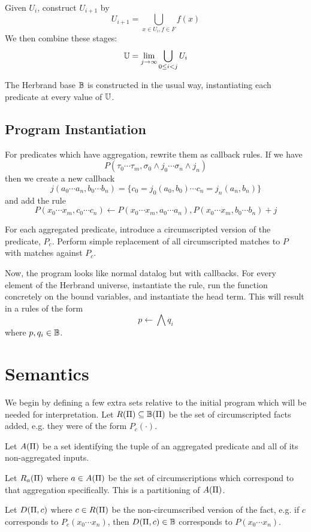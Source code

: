 Given $U_i$, construct $U_{i + 1}$ by
\[
	U_{i + 1} = \bigcup_{x \in U_i, f \in F} f(x)
\]
We then combine these stages:
\[
	\mathbb{U} = \lim_{j \rightarrow \infty} \bigcup_{0 \leq i < j} U_i
\]

The Herbrand base $\mathbb{B}$ is constructed in the usual way, instantiating each predicate at every value of $\mathbb{U}$.

\subsection{Program Instantiation}
For predicates which have aggregation, rewrite them as callback rules.
If we have
\[
	P(\tau_0 \cdots \tau_m, \sigma_0\wedge j_0 \cdots \sigma_n \wedge j_n)
\]
then we create a new callback
\[
	j(a_0 \cdots a_n, b_0 \cdots b_n) = \{c_0 = j_0(a_0, b_0) \cdots c_n = j_n(a_n, b_n)\}
\]
and add the rule
\[
	P(x_0 \cdots x_m, c_0 \cdots c_n) \leftarrow P(x_0 \cdots x_m, a_0 \cdots a_n), P(x_0 \cdots x_m, b_0 \cdots b_n) + j
\]

For each aggregated predicate, introduce a circumscripted version of the predicate, $P_c$.
Perform simple replacement of all circumscripted matches to $P$ with matches against $P_c$.

Now, the program looks like normal datalog but with callbacks.
For every element of the Herbrand universe, instantiate the rule, run the function concretely on the bound variables, and instantiate the head term.
This will result in a rules of the form
\[
	p \leftarrow \bigwedge q_i
\]
where $p, q_i \in \mathbb{B}$.

\section{Semantics}
\label{formal:sec:semantics}
We begin by defining a few extra sets relative to the initial program which will be needed for interpretation.
Let $R(\Pi) \subseteq \mathbb{B}(\Pi)$ be the set of circumscripted facts added, e.g. they were of the form $P_c(\cdot)$.

Let $A(\Pi)$ be a set identifying the tuple of an aggregated predicate and all of its non-aggregated inputs.

Let $R_a(\Pi)$ where $a \in A(\Pi)$ be the set of circumscriptions which correspond to that aggregation specifically.
This is a partitioning of $A(\Pi)$.

Let $D(\Pi, c)$ where $c \in R(\Pi)$ be the non-circumscribed version of the fact, e.g. if $c$ corresponds to $P_c(x_0 \cdots x_n)$, then $D(\Pi, c) \in \mathbb{B}$ corresponds to $P(x_0 \cdots x_n)$.

